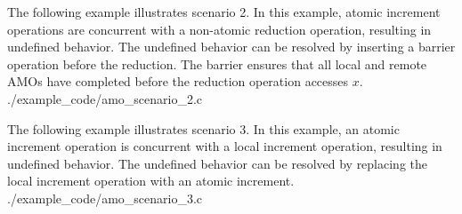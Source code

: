 \cexample
    {The following \CorCpp example illustrates scenario 2.  In this example,
    atomic increment operations are concurrent with a non-atomic reduction
    operation, resulting in undefined behavior.  The undefined behavior can be
    resolved by inserting a barrier operation before the reduction.  The
    barrier ensures that all local and remote AMOs have completed before the
    reduction operation accesses $x$.}
    {./example_code/amo_scenario_2.c}

\cexample
    {The following \CorCpp example illustrates scenario 3.  In this example, an
    \openshmem atomic increment operation is concurrent with a local increment
    operation, resulting in undefined behavior.  The undefined behavior can be
    resolved by replacing the local increment operation with an \openshmem
    atomic increment.}
    {./example_code/amo_scenario_3.c}
